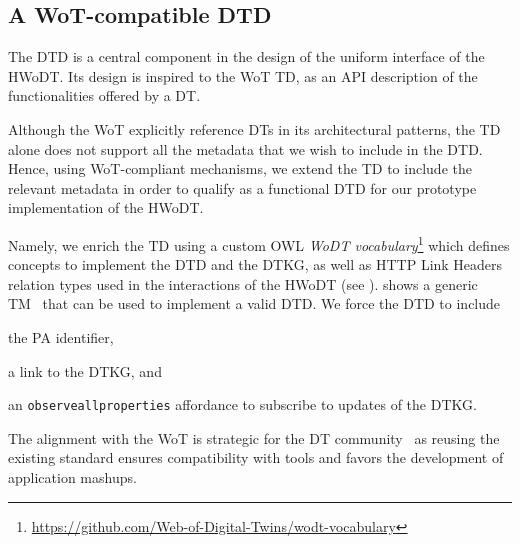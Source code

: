 \subsection{A \acs{WoT}-compatible \acl{DTD}}

The \ac{DTD} is a central component in the design of the uniform interface of the \ac{HWoDT}.
%
Its design is inspired to the \ac{WoT} \ac{TD}, as an \ac{API} description of the functionalities offered by a \ac{DT}.

Although the \ac{WoT} explicitly reference \acp{DT} in its architectural patterns, the \ac{TD} alone does not support all the metadata that we wish to include in the \ac{DTD}.
Hence, using \ac{WoT}-compliant mechanisms, we extend the \ac{TD} to include the relevant metadata in order to qualify as a functional \ac{DTD} for our prototype implementation of the \ac{HWoDT}.

Namely, we enrich the \ac{TD} using a custom \acl{OWL} \emph{\ac{WoDT} vocabulary}\footnote{\url{https://github.com/Web-of-Digital-Twins/wodt-vocabulary}}
which defines concepts to implement the \ac{DTD} and the \ac{DTKG}, as well as HTTP Link Headers relation types used in the interactions of the \ac{HWoDT} (see ).
%
 shows a generic \ac{TM}~\cite{wotthing} that can be used to implement a valid \ac{DTD}. We force the \ac{DTD} to include \begin{inlinelist}
    \item the \ac{PA} identifier, 
    \item a link to the \ac{DTKG}, and
    \item an \texttt{observeallproperties} affordance to subscribe to updates of the \ac{DTKG}.
\end{inlinelist} 



The alignment with the \ac{WoT} is strategic for the \ac{DT} community~\cite{etsi2024tr103845,laurinaho2020datalink} as reusing the existing standard ensures compatibility with tools and favors the development of application mashups.

